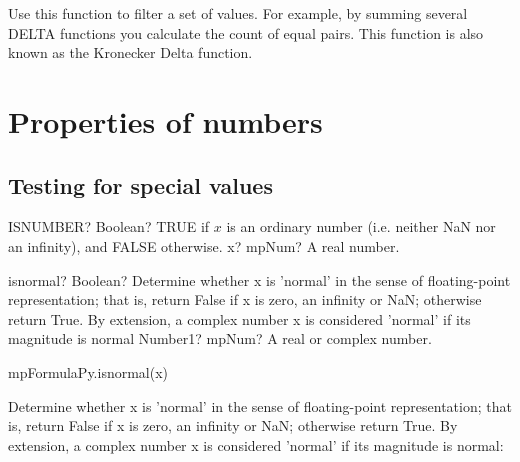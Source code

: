 \vspace{0.3cm}
Use this function to filter a set of values. For example, by summing several DELTA functions you calculate the count of equal pairs. This function is also known as the Kronecker Delta function.





\newpage
\section{Properties of numbers}

\subsection{Testing for special values}




\begin{mpFunctionsExtract}
	\mpWorksheetFunctionOneNotImplemented
	{ISNUMBER? Boolean? TRUE if $x$ is an ordinary number (i.e. neither NaN nor an infinity), and FALSE otherwise.}
	{x? mpNum? A real number.}
\end{mpFunctionsExtract}





\begin{mpFunctionsExtract}
	\mpFunctionOne
	{isnormal? Boolean?  Determine whether x is 'normal' in the sense of floating-point representation; that is, return False if x is zero, an infinity or NaN; otherwise return True. By extension, a complex number x is considered 'normal' if its magnitude is normal}
	{Number1? mpNum? A real or complex number.}
\end{mpFunctionsExtract}


mpFormulaPy.isnormal(x)

\vpara
Determine whether x is 'normal' in the sense of floating-point representation; that is, return False if x is zero, an infinity or NaN; otherwise return True. By extension, a complex number x is considered 'normal' if its magnitude is normal:

